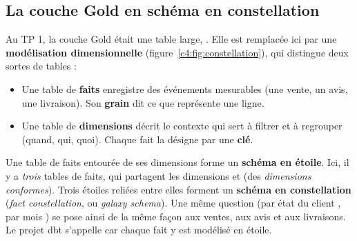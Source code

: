 \subsection*{La couche Gold en schéma en constellation}

Au TP 1, la couche Gold était une table large, . Elle est remplacée ici par une
\textbf{modélisation dimensionnelle} (figure~\ref{c4:fig:constellation}), qui distingue deux sortes de tables :

\begin{itemize}[leftmargin=*,itemsep=1pt]
\item Une table de \textbf{faits} enregistre des événements mesurables (une vente, un avis, une
  livraison). Son \textbf{grain} dit ce que représente une ligne.
\item Une table de \textbf{dimensions} décrit le contexte qui sert à filtrer et à regrouper (quand,
  qui, quoi). Chaque fait la désigne par une \textbf{clé}.
\end{itemize}

Une table de faits entourée de ses dimensions forme un \textbf{schéma en étoile}. Ici, il y a
\emph{trois} tables de faits, qui partagent les dimensions  et  (des
\emph{dimensions conformes}). Trois étoiles reliées entre elles forment un \textbf{schéma en
constellation} (\emph{fact constellation}, ou \emph{galaxy schema}). Une même question (\og par état
du client \fg{}, \og par mois \fg{}) se pose ainsi de la même façon aux ventes, aux avis et aux
livraisons. Le projet dbt s'appelle  car chaque fait y est modélisé en étoile.


